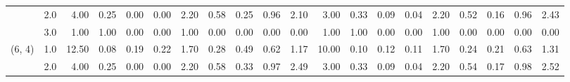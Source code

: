 \begin{tabular}{llrrrrrrrrrrrrrrrrrr}
       & 2.0 &               4.00 &                     0.25 &                                 0.00 &                             0.00 &                           2.20 &                                               0.58 &                                            0.25 &                                            0.96 &                                        2.10 &               3.00 &                     0.33 &                                 0.09 &                             0.04 &                           2.20 &                                               0.52 &                                            0.16 &                                            0.96 &                                        2.43 \\
       & 3.0 &               1.00 &                     1.00 &                                 0.00 &                             0.00 &                           1.00 &                                               0.00 &                                            0.00 &                                            0.00 &                                        0.00 &               1.00 &                     1.00 &                                 0.00 &                             0.00 &                           1.00 &                                               0.00 &                                            0.00 &                                            0.00 &                                        0.00 \\
(6, 4) & 1.0 &              12.50 &                     0.08 &                                 0.19 &                             0.22 &                           1.70 &                                               0.28 &                                            0.49 &                                            0.62 &                                        1.17 &              10.00 &                     0.10 &                                 0.12 &                             0.11 &                           1.70 &                                               0.24 &                                            0.21 &                                            0.63 &                                        1.31 \\
       & 2.0 &               4.00 &                     0.25 &                                 0.00 &                             0.00 &                           2.20 &                                               0.58 &                                            0.33 &                                            0.97 &                                        2.49 &               3.00 &                     0.33 &                                 0.09 &                             0.04 &                           2.20 &                                               0.54 &                                            0.17 &                                            0.98 &                                        2.52 \\

\end{tabular}
